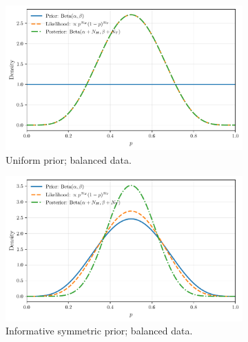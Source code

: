 \begin{exampleBox}
    \begin{figure}[H]
        \centering
        \begin{subfigure}[t]{0.32\textwidth}
            \centering
            \includegraphics[width=\linewidth]{figs/models-vs-data/beta_binomial_uniform_balanced.pdf}
            \caption{Uniform prior; balanced data.}
            \label{fig:beta-binomial-uniform-balanced}
        \end{subfigure}\hfill
        \begin{subfigure}[t]{0.32\textwidth}
            \centering
            \includegraphics[width=\linewidth]{figs/models-vs-data/beta_binomial_informative_balanced.pdf}
            \caption{Informative symmetric prior; balanced data.}
            \label{fig:beta-binomial-informative-balanced}
        \end{subfigure}\hfill
        \begin{subfigure}[t]{0.32\textwidth}
            \centering

\end{subfigure}
\end{figure}
\end{exampleBox}
